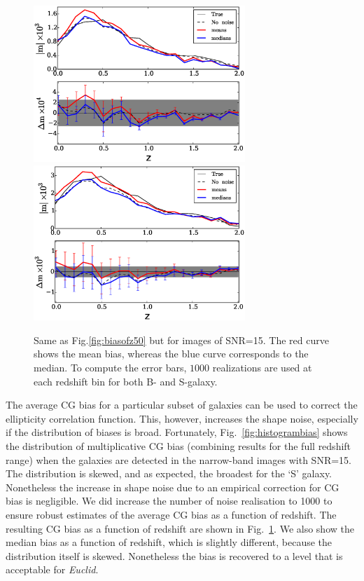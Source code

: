 \documentclass[useAMS,usenatbib]{mnras}
\begin{document}
\begin{figure}
  \includegraphics[width=8.0cm]{zs2n_b_snrtt15_medians.eps}
  \includegraphics[width=8.0cm]{zs2n_s_snrtt15_medians.eps}
\caption{Same as Fig.\ref{fig:biasofz50} but for images of SNR=15.
The red curve shows the mean bias, whereas the blue curve corresponds to the median.
To compute the error bars, $1000$ realizations are used at each redshift bin for both B- and
  S-galaxy.}
\label{fig:biasofz15}
\end{figure}
%

The average CG bias for a particular subset of galaxies can be used to correct the ellipticity correlation function. This, however, increases the shape noise, especially if the distribution of biases is broad.
Fortunately, Fig.~\ref{fig:histogrambias} shows the distribution of multiplicative CG bias (combining results for the full redshift range) when the galaxies are detected in the narrow-band images with SNR=15.
The distribution is skewed, and as expected, the broadest for the `S' galaxy. Nonetheless the increase in shape noise due to an empirical correction for CG bias is negligible. We did increase the number of noise realisation to 1000 to ensure robust estimates of the average CG bias as a function of redshift. The resulting CG bias as a function of redshift are shown in Fig.~\ref{fig:biasofz15}. We also show the median bias as a function of redshift, which is slightly different, because the distribution itself is skewed. Nonetheless the bias is recovered to a level that is acceptable for {\it Euclid}.
\end{document}
